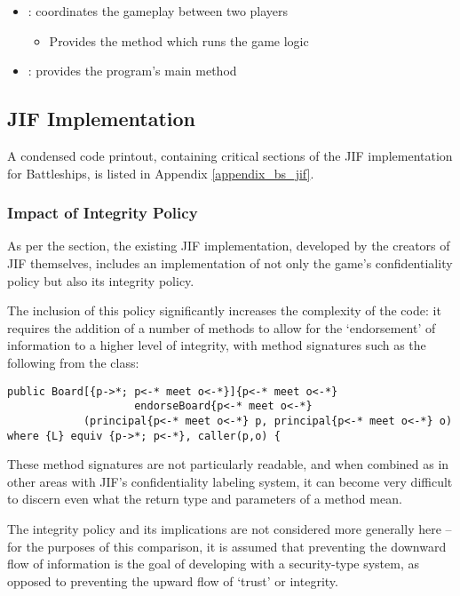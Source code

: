 \begin{itemize}
	\item {}: coordinates the gameplay between two players
	
	\begin{itemize}
		\item Provides the method which runs the game logic
	\end{itemize}
	
	\item {}: provides the program's main method
\end{itemize}

\newpage

\subsection{JIF Implementation} \label{cs_battleships_jif_impl}

A condensed code printout, containing critical sections of the JIF implementation for Battleships, is listed in Appendix \ref{appendix_bs_jif}.

\subsubsection{Impact of Integrity Policy}

As per the  section, the existing JIF implementation, developed by the creators of JIF themselves, includes an implementation of not only the game's confidentiality policy but also its integrity policy.

The inclusion of this policy significantly increases the complexity of the code: it requires the addition of a number of methods to allow for the `endorsement' of information to a higher level of integrity, with method signatures such as the following from the  class:

\begin{verbatim}
public Board[{p->*; p<-* meet o<-*}]{p<-* meet o<-*} 
					endorseBoard{p<-* meet o<-*}
			(principal{p<-* meet o<-*} p, principal{p<-* meet o<-*} o)
where {L} equiv {p->*; p<-*}, caller(p,o) {
\end{verbatim}

These method signatures are not particularly readable, and when combined as in other areas with JIF's confidentiality labeling system, it can become very difficult to discern even what the return type and parameters of a method mean.

The integrity policy and its implications are not considered more generally here -- for the purposes of this comparison, it is assumed that preventing the downward flow of information is the goal of developing with a security-type system, as opposed to preventing the upward flow of `trust' or integrity.

